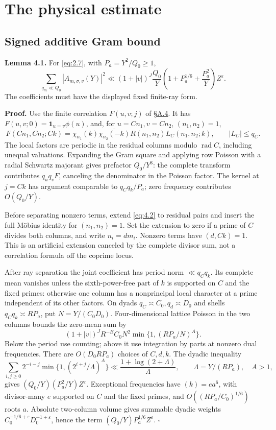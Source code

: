 \documentclass[11pt,a4paper]{article}
\begin{document}
\section{The physical estimate}\label{sec:4}

\subsection{Signed additive Gram bound}\label{sec:4.1}

\textbf{Lemma 4.1.} For \eqref{eq:2.7}, with \(P_a=Y^2/Q_0\ge1\), \[
 \sum_{q_m\ll Q_0}|A_{m,\sigma,v}(Y)|^2
 \ll (1+|v|)^J\frac{Q_0}{Y}
 \left(1+P_a^{1/6}+\frac{P_a^2}{Y}\right)Z^\varepsilon.
\tag{4.1}\label{eq:4.1}
\] The coefficients must have the displayed fixed finite-ray form.

\textbf{Proof.} Use the finite correlation \(F(u,v;j)\) of \hyperref[sec:A.4]{§A.4}. It has \(F(u,v;0)=\mathbf1_{u=v}\phi(u)\), and, for \(u=Cn_1,v=Cn_2\), \((n_1,n_2)=1\), \[
 F(Cn_1,Cn_2;Ck)=\chi_{n_1}(k)\overline{\chi_{n_2}(-k)}R(n_1,n_2)
 L_C(n_1,n_2;k),\qquad |L_C|\le q_C.
\tag{4.2}\label{eq:4.2}
\] The local factors are periodic in the residual columns modulo \(\operatorname{rad}C\), including unequal valuations. Expanding the Gram square and applying row Poisson with a radial Schwartz majorant gives prefactor \(Q_0/Y^3\): the complete transform contributes \(q_uq_vF\), canceling the denominator in the Poisson factor. The kernel at \(j=Ck\) has argument comparable to \(q_Cq_k/P_a\); zero frequency contributes \(O(Q_0/Y)\).

Before separating nonzero terms, extend \eqref{eq:4.2} to residual pairs and insert the full Möbius identity for \((n_1,n_2)=1\). Set the extension to zero if a prime of \(C\) divides both columns, and write \(n_i=dm_i\). Nonzero terms have \((d,Ck)=1\). This is an artificial extension canceled by the complete divisor sum, not a correlation formula off the coprime locus.

After ray separation the joint coefficient has period norm \(\ll q_Cq_k\). Its complete mean vanishes unless the sixth-power-free part of \(k\) is supported on \(C\) and the fixed primes: otherwise one column has a nonprincipal local character at a prime independent of its other factors. On dyads \(q_C\asymp C_0,q_d\asymp D_0\) and shells \(q_Cq_k\asymp RP_a\), put \(N=Y/(C_0D_0)\). Four-dimensional lattice Poisson in the two columns bounds the zero-mean sum by \[
 (1+|v|)^J R^{-B}C_0N^2\min\{1,(RP_a/N)^A\}.
\tag{4.3}\label{eq:4.3}
\] Below the period use counting; above it use integration by parts at nonzero dual frequencies. There are \(O(D_0RP_a)\) choices of \(C,d,k\). The dyadic inequality \[
 \sum_{i,j\ge0}2^{-i-j}\min\{1,(2^{i+j}/\Lambda)^A\}
 \ll\frac{1+\log(2+\Lambda)}{\Lambda},\qquad \Lambda=Y/(RP_a),\quad A>1,
\] gives \((Q_0/Y)(P_a^2/Y)Z^\varepsilon\). Exceptional frequencies have \((k)=ea^6\), with divisor-many \(e\) supported on \(C\) and the fixed primes, and \(O((RP_a/C_0)^{1/6})\) roots \(a\). Absolute two-column volume gives summable dyadic weights \(C_0^{-1/6+\varepsilon}D_0^{-1+\varepsilon}\), hence the term \((Q_0/Y)P_a^{1/6}Z^\varepsilon\). \hfill\(\square\)
\end{document}
